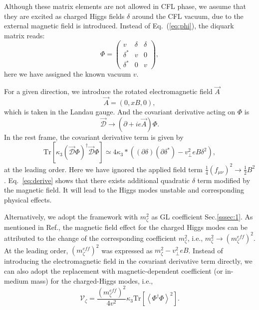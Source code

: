 \documentclass[prd, showpacs,nofootinbib,amsmath,amssymb]{revtex4}
\begin{document}
Although these matrix elements are not allowed in CFL phase, we assume that they are excited as charged Higgs fields $\delta$
around the CFL vacuum,
due to the external magnetic field is introduced.
Instead of Eq.~(\ref{eq:phi}),
the diquark matrix reads:
\begin{equation}
  \label{eq:diquarkmatrix0}
\Phi = \begin{pmatrix} v & \delta & \delta \\ \delta^* &  v & 0 \\ \delta^* & 0 & v\end{pmatrix},
\end{equation}
here we have assigned the known vacuum $v$.




For a given direction, we introduce the rotated electromagnetic field $\vec{A}$
\begin{equation}
\vec{A} = (0,xB,0),
\end{equation}
which is taken in the Landau gauge.
And the covariant derivative acting on $\Phi$ is
\begin{equation}
\vec{\mathcal{D}} \rightarrow (\partial + i e \vec{A})\Phi.
\end{equation}
In the rest frame, the covariant derivative term is given by
\begin{equation}
\label{eq:derive}
 \text{Tr}\left[\kappa_3(\vec{\mathcal{D}}\Phi)^\dagger\vec{\mathcal{D}}\Phi \right]\simeq 4\kappa_3*((\partial \delta)(\partial \delta^*) -v_\perp^2 eB\delta^2),
\end{equation}
 at the leading order.
Here we have ignored the applied field term $\frac{1}{4}(f_{\mu\nu})^2 \rightarrow \frac{1}{2}B^2$.
Eq.~\eqref{eq:derive} shows that there exists additional quadratic $\delta$  term modified by the magnetic field.
It will lead to the Higgs modes unstable and  corresponding physical effects.


Alternatively, we adopt the framework with $m_\zeta^2$ as GL coefficient Sec.\ref{sssec:1}.
As mentioned in Ref.\cite{zhang2015magnetic},  the magnetic field effect for the charged Higgs modes
can be attributed to
the change of the corresponding coefficient $m_\zeta^2$, i.e., $m_\zeta^2 \rightarrow (m_\zeta^{eff})^2$.
At the leading order, $(m_\zeta^{eff})^2$ was expressed as $m_\zeta^2 -v_\perp^2 eB$.
Instead of introducing the electromagnetic field in the covariant derivative term directly,
we can also adopt the replacement with magnetic-dependent coefficient (or in-medium mass) for the charged-Higgs modes, i.e.,
\begin{equation}
 \mathcal{V}_\zeta=
\frac{(m_\zeta^{eff})^2}{4v^2}\kappa_3\text{Tr}\left[\left<\Phi^\dagger\Phi\right>^2\right].
\end{equation}
\end{document}
